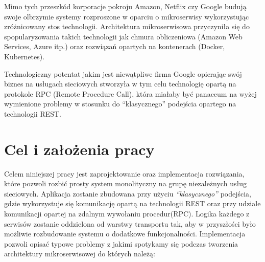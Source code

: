 Mimo tych przeszkód korporacje pokroju Amazon, Netflix czy Google budują swoje olbrzymie systemy rozproszone w oparciu o mikroserwisy wykorzystując zróżnicowany stos technologii. Architektura mikroserwisowa przyczyniła się do spopularyzowania takich technologii jak chmura obliczeniowa (Amazon Web Services, Azure itp.) oraz rozwiązań opartych na kontenerach (Docker, Kubernetes).
\par Technologiczny potentat jakim jest niewątpliwe firma Google opierając swój biznes na usługach sieciowych stworzyła w tym celu technologię opartą na protokole RPC (Remote Procedure Call), która miałaby być panaceum na wyżej wymienione problemy w stosunku do \enquote{klasycznego} podejścia opartego na technologii REST\@.
\section{Cel i założenia pracy}
Celem niniejszej pracy jest zaprojektowanie oraz implementacja rozwiązania, które pozwoli rozbić prosty system monolityczny na grupę niezależnych usług sieciowych. Aplikacja zostanie zbudowana przy użyciu \textit{\enquote{klasycznego}} podejścia, gdzie wykorzystuje się komunikację opartą na technologii REST oraz przy udziale komunikacji opartej na zdalnym wywołaniu procedur(RPC). Logika każdego z serwisów zostanie oddzielona od warstwy transportu tak, aby w przyszłości było możliwie rozbudowanie systemu o dodatkowe funkcjonalności. Implementacja pozwoli opisać typowe problemy z jakimi spotykamy się podczas tworzenia architektury mikroserwisowej do których należą:
